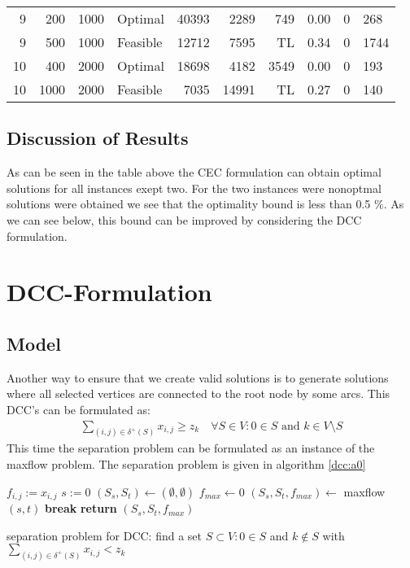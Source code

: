 \documentclass[11pt]{article}
\begin{document}
\begin{tabular}{rrrlrrrrll}
    9 &   200 &       1000 &   Optimal &      40393 &      2289 &           749 &         0.00 &      0 &    268 \\
    9 &   500 &       1000 &  Feasible &      12712 &      7595 &          TL &         0.34 &      0 &   1744 \\
   10 &   400 &       2000 &   Optimal &      18698 &      4182 &          3549 &         0.00 &      0 &    193 \\
   10 &  1000 &       2000 &  Feasible &       7035 &     14991 &          TL &         0.27 &      0 &    140 \\
\bottomrule
\end{tabular}
\subsection{Discussion of Results}
As can be seen in the table above the CEC formulation can obtain optimal solutions for all instances exept two. For the two instances were nonoptmal solutions were obtained we see that the optimality bound is less than 0.5 $\%$. As we can see below, this bound can be improved by considering the DCC formulation.

\section{DCC-Formulation}
\subsection{Model}
Another way to ensure that we create valid solutions is to generate solutions where all selected vertices are connected to the root node by some arcs. This DCC's can be formulated as:
\begin{gather}
	\sum\limits_{(i,j)\in \delta^+(S)} x_{i,j} \geq z_k \quad \forall S \in V:0 \in S \text{ and } k\in V\setminus S \label{dcc:f0}
\end{gather}
This time the separation problem can be formulated as an instance of the maxflow problem. The separation problem is given in algorithm \ref{dcc:a0}

\begin{algorithm}[H]
\DontPrintSemicolon
  $f_{i,j} := x_{i,j}$ 
  $s:=0$ 
  $(S_s, S_t) \leftarrow (\emptyset, \emptyset)$  
  $f_{max} \leftarrow 0$  
  {
  	$(S_s, S_t, f_{max}) \leftarrow$ maxflow$(s,t)$ 
  	{
  	\textbf{break}\;
  	}
  }
  \textbf{return} $(S_s, S_t, f_{max})$\;
\caption{separation problem for DCC: find a set $S\subset V: 0\in S$ and $k\not\in S$ with $\sum\limits_{(i,j)\in\delta^+(S)}x_{i,j}<z_k$}
\label{dcc:a0}
\end{algorithm}
\end{document}
